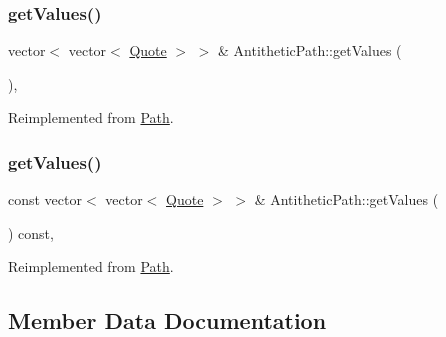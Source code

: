\subsubsection{\texorpdfstring{get\+Values()}{getValues()}\hspace{0.1cm}{\footnotesize\ttfamily [1/2]}}
{\footnotesize\ttfamily vector$<$ vector$<$ \hyperlink{_name_def_8h_a642a6c5fd87319d922637de0e0bb0305}{Quote} $>$ $>$ \& Antithetic\+Path\+::get\+Values (\begin{DoxyParamCaption}{ }\end{DoxyParamCaption})\hspace{0.3cm}{\ttfamily [override]}, {\ttfamily [virtual]}}



Reimplemented from \hyperlink{class_path_aeeb21dd5019a717cc8a36ddb0f82f427}{Path}.

\hypertarget{class_antithetic_path_ad15cfc2a074fd27bd3119ddafa24c3bd}{}\label{class_antithetic_path_ad15cfc2a074fd27bd3119ddafa24c3bd} 
\subsubsection{\texorpdfstring{get\+Values()}{getValues()}\hspace{0.1cm}{\footnotesize\ttfamily [2/2]}}
{\footnotesize\ttfamily const vector$<$ vector$<$ \hyperlink{_name_def_8h_a642a6c5fd87319d922637de0e0bb0305}{Quote} $>$ $>$ \& Antithetic\+Path\+::get\+Values (\begin{DoxyParamCaption}{ }\end{DoxyParamCaption}) const\hspace{0.3cm}{\ttfamily [override]}, {\ttfamily [virtual]}}



Reimplemented from \hyperlink{class_path_a6d3469e98b5da124b51ca8a9cc2caa28}{Path}.



\subsection{Member Data Documentation}
\hypertarget{class_antithetic_path_a4aae58299bbbd6516c71fc837bcfe3e7}{}\label{class_antithetic_path_a4aae58299bbbd6516c71fc837bcfe3e7} 
